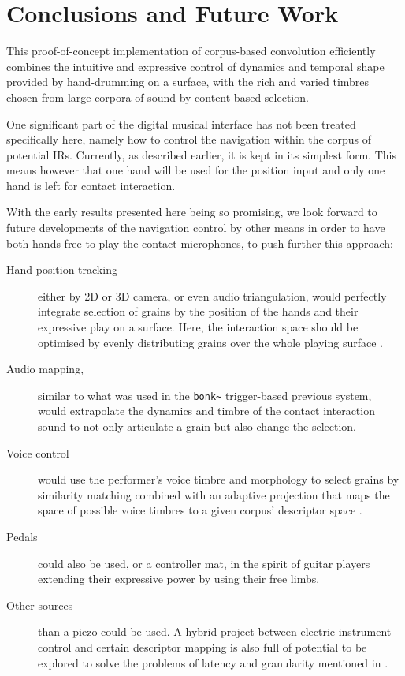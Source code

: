 \section{Conclusions and Future Work}\label{sec:future}

This proof-of-concept implementation of corpus-based convolution efficiently combines the intuitive and expressive control of dynamics and temporal shape provided by hand-drumming on a surface, with the rich and varied timbres chosen from large corpora of sound by content-based selection.


One significant part of the digital musical interface has not been treated specifically here, namely how to control the navigation within the corpus of potential IRs. Currently, as described earlier, it is kept in its simplest form. This means however that one hand will be used for the position input and only one hand is left for contact interaction.

With the early results presented here being so promising, we look forward to future developments of the navigation control by other means in order to have both hands free to play the contact microphones, to push further this approach:

\begin{description}
\item[Hand position tracking] either by 2D or 3D camera, or even audio triangulation, would perfectly integrate selection of grains by the position of the hands and their expressive play on a surface.  Here, the interaction space should be optimised by evenly distributing grains over the whole playing surface \cite{LallemandSchwarz-dafx2011-distribute}.
\item[Audio mapping,] similar to what was used in the \verb|bonk~| trigger-based previous system, would extrapolate the dynamics and timbre of the contact interaction sound to not only articulate a grain but also change the selection.
\item[Voice control] would use the performer's voice timbre and morphology to select grains by similarity matching combined with an adaptive projection that maps the space of possible voice timbres to a given corpus' descriptor space \cite{StowellPlumbley-smc2010-timbre-remapping-regression-tree,Fasciani-si2013b}.
\item[Pedals] could also be used, or a controller mat, in the spirit of guitar players extending their expressive power by using their free limbs.
\item[Other sources] than a piezo could be used. A hybrid project between electric instrument control and certain descriptor mapping is also full of potential to be explored to solve the problems of latency and granularity mentioned in \cite{TremblaySchwarz-nime2010-surfing-the-waves}.
\end{description}

